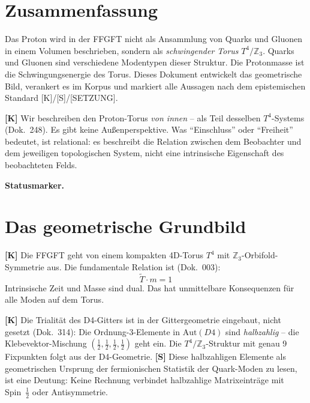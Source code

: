 
\section*{Zusammenfassung}

Das Proton wird in der FFGFT nicht als Ansammlung von Quarks und
Gluonen in einem Volumen beschrieben, sondern als \emph{schwingender
Torus} $T^4/\mathbb{Z}_3$. Quarks und Gluonen sind verschiedene
Modentypen dieser Struktur. Die Protonmasse ist die Schwingungsenergie
des Torus. Dieses Dokument entwickelt das geometrische Bild, verankert
es im Korpus und markiert alle Aussagen nach dem epistemischen Standard
[K]/[S]/[SETZUNG].

\begin{tcolorbox}[colback=blue!5!white,colframe=blue!60!black,
  title=Zur Lesart: Innen-Perspektive]
\textbf{[K]} Wir beschreiben den Proton-Torus \emph{von innen} --
als Teil desselben $T^4$-Systems (Dok.~248). Es gibt keine
Außenperspektive. Was ``Einschluss'' oder ``Freiheit'' bedeutet,
ist relational: es beschreibt die Relation zwischen dem Beobachter
und dem jeweiligen topologischen System, nicht eine intrinsische
Eigenschaft des beobachteten Felds.
\end{tcolorbox}

\medskip\noindent\textbf{Statusmarker.}


\section{Das geometrische Grundbild}

\textbf{[K]} Die FFGFT geht von einem kompakten 4D-Torus $T^4$ mit
$\mathbb{Z}_3$-Orbifold-Symmetrie aus. Die fundamentale Relation ist
(Dok.~003):
\begin{equation}
  \tilde{T} \cdot m = 1
\end{equation}
Intrinsische Zeit und Masse sind dual. Das hat unmittelbare Konsequenzen
für alle Moden auf dem Torus.

\textbf{[K]} Die Trialität des D4-Gitters ist in der Gittergeometrie
eingebaut, nicht gesetzt (Dok.~314): Die Ordnung-3-Elemente in
$\text{Aut}(D4)$ sind \emph{halbzahlig} -- die Klebevektor-Mischung
$(\tfrac{1}{2},\tfrac{1}{2},\tfrac{1}{2},\tfrac{1}{2})$ geht ein. Die
$T^4/\mathbb{Z}_3$-Struktur mit genau 9 Fixpunkten folgt aus der
D4-Geometrie. \textbf{[S]} Diese halbzahligen Elemente als geometrischen
Ursprung der fermionischen Statistik der Quark-Moden zu lesen, ist eine
Deutung: Keine Rechnung verbindet halbzahlige Matrixeinträge mit
Spin~$\tfrac12$ oder Antisymmetrie.

